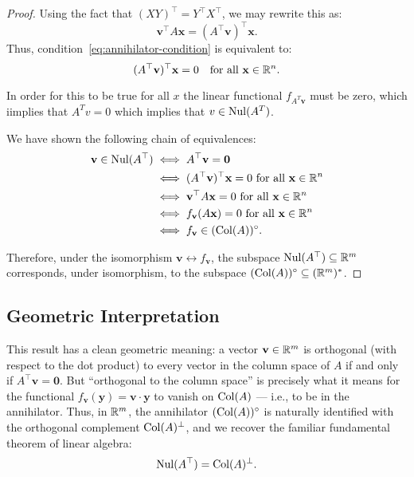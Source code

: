 \begin{theorem}
\begin{proof}
Using the fact that $(XY)^\top = Y^\top X^\top$, we may rewrite this as:
\[
\mathbf{v}^\top A \mathbf{x} = (A^\top \mathbf{v})^\top \mathbf{x}.
\]
Thus, condition~\eqref{eq:annihilator-condition} is equivalent to:
\[
(A^\top \mathbf{v})^\top \mathbf{x} = 0 \quad \text{for all } \mathbf{x} \in \mathbb{R}^n.
\]

In order for this to be true for all $x$ the linear functional $f_{A^T \mathbf{v}}$ must be zero, which iimplies that $A^T v = 0$ which implies that $v \in \operatorname{Nul}(A^T)$.


We have shown the following chain of equivalences:
\begin{align*}
\mathbf{v} \in \operatorname{Nul}(A^\top) 
&\iff A^\top \mathbf{v} = \mathbf{0} \\
&\iff (A^\top \mathbf{v})^\top \mathbf{x} = 0 \text{ for all } \mathbf{x} \in \mathbb{R}^n \\
&\iff \mathbf{v}^\top A \mathbf{x} = 0 \text{ for all } \mathbf{x} \in \mathbb{R}^n \\
&\iff f_{\mathbf{v}}(A\mathbf{x}) = 0 \text{ for all } \mathbf{x} \in \mathbb{R}^n \\
&\iff f_{\mathbf{v}} \in (\operatorname{Col}(A))^\circ.
\end{align*}

Therefore, under the isomorphism $\mathbf{v} \leftrightarrow f_{\mathbf{v}}$, the subspace $\operatorname{Nul}(A^\top) \subseteq \mathbb{R}^m$ corresponds, under isomorphism, to the subspace $(\operatorname{Col}(A))^\circ \subseteq (\mathbb{R}^m)^*$.

\end{proof}
\end{theorem}

\subsection*{Geometric Interpretation}

This result has a clean geometric meaning:  
a vector $\mathbf{v} \in \mathbb{R}^m$ is orthogonal (with respect to the dot product) to every vector in the column space of $A$ if and only if $A^\top \mathbf{v} = \mathbf{0}$.  
But ``orthogonal to the column space'' is precisely what it means for the functional $f_{\mathbf{v}}(\mathbf{y}) = \mathbf{v} \cdot \mathbf{y}$ to vanish on $\operatorname{Col}(A)$ — i.e., to be in the annihilator.  
Thus, in $\mathbb{R}^m$, the annihilator $(\operatorname{Col}(A))^\circ$ is naturally identified with the orthogonal complement $\operatorname{Col}(A)^\perp$, and we recover the familiar fundamental theorem of linear algebra:
\[
\operatorname{Nul}(A^\top) = \operatorname{Col}(A)^\perp.
\]







